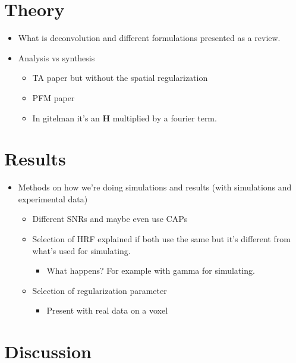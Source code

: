 \documentclass[5p]{elsarticle}
\begin{document}
\section{Theory}

\begin{itemize}
    \item What is deconvolution and different formulations presented as a review.
    \item Analysis vs synthesis
    \begin{itemize}
        \item TA paper but without the spatial regularization
        \item PFM paper
        \item In gitelman it's an $\mathbf{H}$ multiplied by a fourier term.
    \end{itemize}
\end{itemize}

\section{Results}

\begin{itemize}
    \item Methods on how we're doing simulations and results (with simulations and experimental data)
    \begin{itemize}
        \item Different SNRs and maybe even use CAPs
        \item Selection of HRF explained if both use the same but it's different from what's used for simulating.
        \begin{itemize}
            \item What happens? For example with gamma for simulating.
        \end{itemize}
        \item Selection of regularization parameter
        \begin{itemize}
            \item Present with real data on a voxel
        \end{itemize}
    \end{itemize}
\end{itemize}

\section{Discussion}
\end{document}
